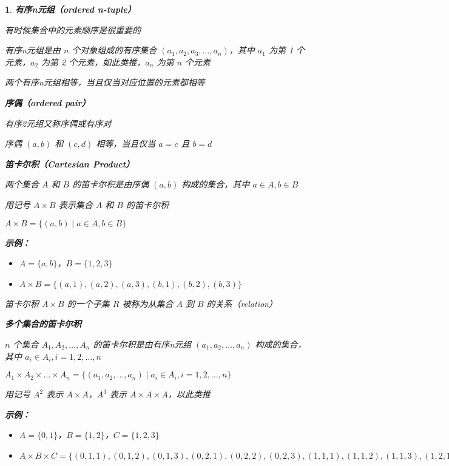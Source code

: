 \documentclass[UTF8]{report}
\theoremstyle{MyLineTheoremStyle} %
\theoremstyle{MyBlockTheoremStyle} %
\theoremstyle{MySubsubsectionStyle} %
\newtheorem{definition}{}
\begin{document}
\begin{definition}
    \textbf{有序n元组（ordered n-tuple）}\par
    有时候集合中的元素顺序是很重要的\par
    有序n元组是由 $n$ 个对象组成的有序集合 $(a_1, a_2, a_3, \ldots, a_n)$，其中 $a_1$ 为第 1 个元素，$a_2$ 为第 2 个元素，如此类推，$a_n$ 为第 $n$ 个元素\par
    两个有序n元组相等，当且仅当对应位置的元素都相等\par

    \textbf{序偶（ordered pair）}\par
    有序2元组又称序偶或有序对\par
    序偶 $(a, b)$ 和 $(c, d)$ 相等，当且仅当 $a = c$ 且 $b = d$\par

    \textbf{笛卡尔积（Cartesian Product）}\par
    两个集合 $A$ 和 $B$ 的笛卡尔积是由序偶 $(a, b)$ 构成的集合，其中 $a \in A, b \in B$\par
    用记号 $A \times B$ 表示集合 $A$ 和 $B$ 的笛卡尔积\par
    $A \times B = \{(a, b) \mid a \in A, b \in B\}$\par

    \textbf{示例：}\par
    \begin{itemize}
        \item $A = \{a, b\}$，$B = \{1, 2, 3\}$
        \item $A \times B = \{(a, 1), (a, 2), (a, 3), (b, 1), (b, 2), (b, 3)\}$
    \end{itemize}

    笛卡尔积 $A \times B$ 的一个子集 $R$ 被称为从集合 $A$ 到 $B$ 的关系（relation）\par

    \textbf{多个集合的笛卡尔积}\par
    $n$ 个集合 $A_1, A_2, \ldots, A_n$ 的笛卡尔积是由有序n元组 $(a_1, a_2, \ldots, a_n)$ 构成的集合，其中 $a_i \in A_i, i = 1, 2, \ldots, n$\par
    $A_1 \times A_2 \times \ldots \times A_n = \{(a_1, a_2, \ldots, a_n) \mid a_i \in A_i, i = 1, 2, \ldots, n\}$\par
    用记号 $A^2$ 表示 $A \times A$，$A^3$ 表示 $A \times A \times A$，以此类推\par

    \textbf{示例：}\par
    \begin{itemize}
        \item $A = \{0, 1\}$，$B = \{1, 2\}$，$C = \{1, 2, 3\}$
        \item $A \times B \times C = \{(0, 1, 1), (0, 1, 2), (0, 1, 3), (0, 2, 1), (0, 2, 2), (0, 2, 3), (1, 1, 1), (1, 1, 2), (1, 1, 3), (1, 2, 1), (1, 2, 2), (1, 2, 3)\}$
    \end{itemize}
\end{definition}
\end{document}
